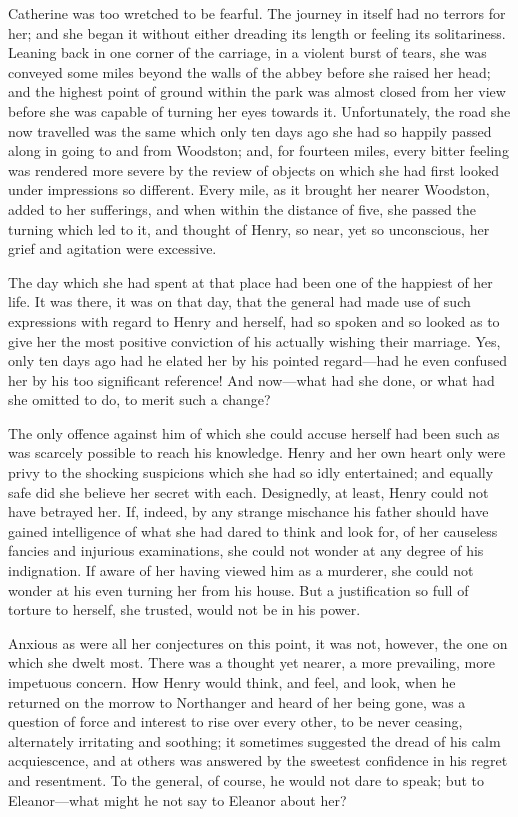 Catherine was too wretched to be fearful. The journey in itself had no terrors for her; and she began it without either dreading its length or feeling its solitariness. Leaning back in one corner of the carriage, in a violent burst of tears, she was conveyed some miles beyond the walls of the abbey before she raised her head; and the highest point of ground within the park was almost closed from her view before she was capable of turning her eyes towards it. Unfortunately, the road she now travelled was the same which only ten days ago she had so happily passed along in going to and from Woodston; and, for fourteen miles, every bitter feeling was rendered more severe by the review of objects on which she had first looked under impressions so different. Every mile, as it brought her nearer Woodston, added to her sufferings, and when within the distance of five, she passed the turning which led to it, and thought of Henry, so near, yet so unconscious, her grief and agitation were excessive.

The day which she had spent at that place had been one of the happiest of her life. It was there, it was on that day, that the general had made use of such expressions with regard to Henry and herself, had so spoken and so looked as to give her the most positive conviction of his actually wishing their marriage. Yes, only ten days ago had he elated her by his pointed regard---had he even confused her by his too significant reference! And now---what had she done, or what had she omitted to do, to merit such a change?

The only offence against him of which she could accuse herself had been such as was scarcely possible to reach his knowledge. Henry and her own heart only were privy to the shocking suspicions which she had so idly entertained; and equally safe did she believe her secret with each. Designedly, at least, Henry could not have betrayed her. If, indeed, by any strange mischance his father should have gained intelligence of what she had dared to think and look for, of her causeless fancies and injurious examinations, she could not wonder at any degree of his indignation. If aware of her having viewed him as a murderer, she could not wonder at his even turning her from his house. But a justification so full of torture to herself, she trusted, would not be in his power.

Anxious as were all her conjectures on this point, it was not, however, the one on which she dwelt most. There was a thought yet nearer, a more prevailing, more impetuous concern. How Henry would think, and feel, and look, when he returned on the morrow to Northanger and heard of her being gone, was a question of force and interest to rise over every other, to be never ceasing, alternately irritating and soothing; it sometimes suggested the dread of his calm acquiescence, and at others was answered by the sweetest confidence in his regret and resentment. To the general, of course, he would not dare to speak; but to Eleanor---what might he not say to Eleanor about her?

